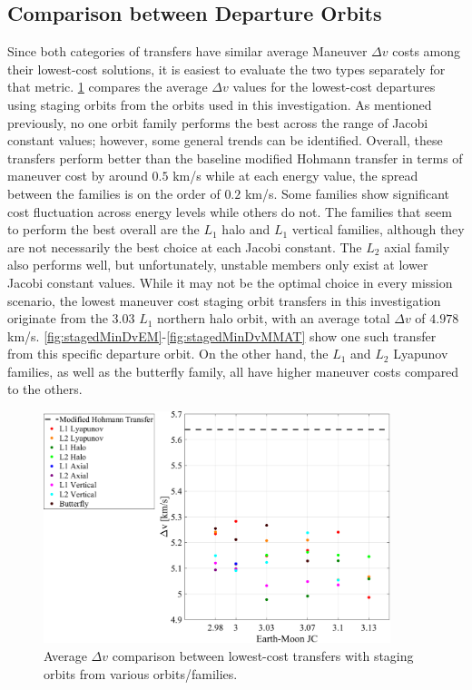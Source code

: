 \subsection{Comparison between Departure Orbits}
Since both categories of transfers have similar average Maneuver $\Delta v$ costs among their
lowest-cost solutions, it is easiest to evaluate the two types separately for that metric.
\cref{fig:compareDeltavStaged} compares the average $\Delta v$ values for the lowest-cost
departures using staging orbits from the orbits used in this investigation. As mentioned
previously, no one orbit family performs the best across the range of Jacobi constant values;
however, some general trends can be identified. Overall, these transfers perform better than the
baseline modified Hohmann transfer in terms of maneuver cost by around $0.5$ km/s while at each
energy value, the spread between the families is on the order of $0.2$ km/s. Some families show
significant cost fluctuation across energy levels while others do not. The families that seem to
perform the best overall are the $L_{1}$ halo and $L_{1}$ vertical families, although they are not
necessarily the best choice at each Jacobi constant. The $L_{2}$ axial family also performs well,
but unfortunately, unstable members only exist at lower Jacobi constant values. While it may not be
the optimal choice in every mission scenario, the lowest maneuver cost staging orbit transfers in
this investigation originate from the $3.03$ $L_{1}$ northern halo orbit, with an average total
$\Delta v$ of $4.978$ km/s. \cref{fig:stagedMinDvEM}-\cref{fig:stagedMinDvMMAT} show one such
transfer from this specific departure orbit. On the other hand, the $L_{1}$ and $L_{2}$ Lyapunov
families, as well as the butterfly family, all have higher maneuver costs compared to the others.

\begin{figure}[!htb]
    \centering
    \includegraphics[width=0.9\textwidth]{figures/DeltavComparisonStaged.pdf}
    \caption{Average $\Delta v$ comparison between lowest-cost transfers with staging orbits from various orbits/families.}
    \label{fig:compareDeltavStaged}
\end{figure}

